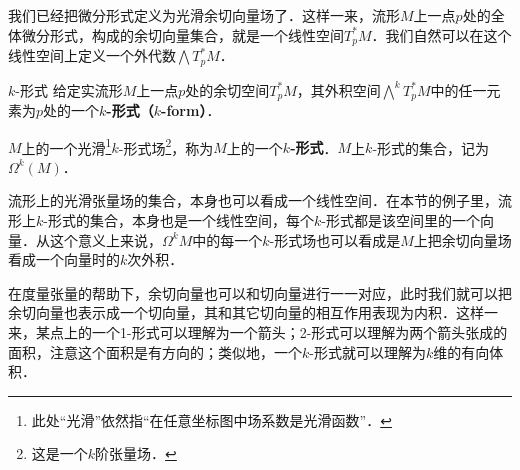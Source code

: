 我们已经把微分形式定义为光滑余切向量场了．这样一来，流形$M$上一点$p$处的全体微分形式，构成的余切向量集合，就是一个线性空间$T^*_pM$．我们自然可以在这个线性空间上定义一个外代数$\bigwedge T^*_pM$．

\begin{definition}{$k$-形式}
给定实流形$M$上一点$p$处的余切空间$T^*_pM$，其外积空间$\bigwedge^kT^*_pM$中的任一元素为$p$处的一个\textbf{$k$-形式（$k$-form）}．

$M$上的一个光滑\footnote{此处“光滑”依然指“在任意坐标图中场系数是光滑函数”．}$k$-形式场\footnote{这是一个$k$阶张量场．}，称为$M$上的一个\textbf{$k$-形式}．$M$上$k$-形式的集合，记为$\Omega^k(M)$．
\end{definition}

流形上的光滑张量场的集合，本身也可以看成一个线性空间．在本节的例子里，流形上$k$-形式的集合，本身也是一个线性空间，每个$k$-形式都是该空间里的一个向量．从这个意义上来说，$\Omega^k{M}$中的每一个$k$-形式场也可以看成是$M$上把余切向量场看成一个向量时的$k$次外积．

在度量张量的帮助下，余切向量也可以和切向量进行一一对应，此时我们就可以把余切向量也表示成一个切向量，其和其它切向量的相互作用表现为内积．这样一来，某点上的一个1-形式可以理解为一个箭头；2-形式可以理解为两个箭头张成的面积，注意这个面积是有方向的；类似地，一个$k$-形式就可以理解为$k$维的有向体积．







